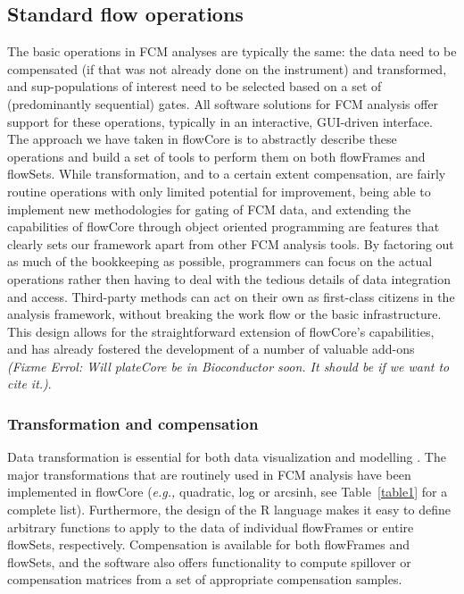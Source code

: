 \documentclass[12pt]{article}
\begin{document}


\subsection*{Standard flow operations}

The basic operations in FCM analyses are typically the same: the data
need to be compensated (if that was not already done on the instrument)
and transformed, and sup-populations of interest need to be selected
based on a set of (predominantly sequential) gates. All software
solutions for FCM analysis offer support for
these operations, typically in an interactive, GUI-driven interface. The
approach we have taken in flowCore is to abstractly describe these
operations and build a set of tools to perform them on both flowFrames
and flowSets. While transformation, and to a certain extent
compensation, are fairly routine operations with only limited
potential for improvement, being able to implement new methodologies
for gating of FCM data, and extending the capabilities of flowCore
through object oriented programming are features that clearly sets our
framework apart from other FCM analysis tools. By factoring out as
much of the bookkeeping as possible, programmers can focus on the
actual operations rather then having to deal with the tedious details
of data integration and access. Third-party methods can act on their
own as first-class citizens in the analysis framework, without
breaking the work flow or the basic infrastructure. This design allows
for the straightforward extension of flowCore's capabilities, and has
already fostered the development of a number of valuable add-ons
\citep{lo2008agf,sarkar2008ufv} \textit{(Fixme Errol: Will plateCore
  be in Bioconductor soon. It should be if we want to cite it.)}.

\subsubsection*{Transformation and compensation}

Data transformation is essential for both data visualization and
modelling \citep{lo2008agf}. The major transformations that are
routinely used in FCM analysis have been implemented in flowCore
(\textit{e.g.,} quadratic, log or arcsinh, see Table~\ref{table1} for a
complete list). Furthermore, the design of the R language makes it
easy to define arbitrary functions to apply to the data of individual
flowFrames or entire flowSets, respectively. Compensation is
available for both flowFrames and flowSets, and the software also
offers functionality to compute spillover or compensation matrices
from a set of appropriate compensation samples.
\end{document}
